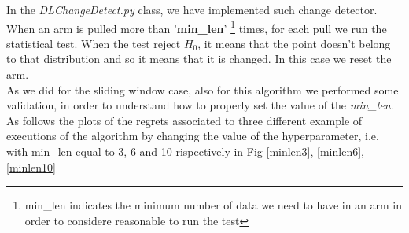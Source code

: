 In the \textit{DLChangeDetect.py} class, we have implemented such change detector. When an arm is pulled more than '\textbf{min\_len}' \footnote{min\_len indicates the minimum number of data we need to have in an arm in order to considere reasonable to run the test} times, for each pull we run the statistical test. When the test reject $H_0$, it means that the point doesn't belong to that distribution and so it means that it is changed. In this case we reset the arm.\\ 
As we did for the sliding window case, also for this algorithm we performed some validation, in order to understand how to properly set the value of the \textit{min\_len}. As follows the plots of the regrets associated to three different example of executions of the algorithm by changing the value of the hyperparameter, i.e. with min\_len equal to 3, 6 and 10 rispectively in Fig \ref{minlen3}, \ref{minlen6}, \ref{minlen10}

